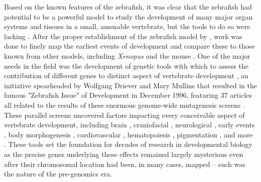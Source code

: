 Based on the known features of the zebrafish, it was clear that the zebrafish had potential to be a powerful model to study the development of many major organ systems and tissues in a small, amenable vertebrate, but the tools to do so were lacking \citep{Bakkers2011}. After the proper establishment of the zebrafish model by \citeauthor{Streisinger1981}, work was done to finely map the earliest events of development and compare these to those known from other models, including \textit{Xenopus} and the mouse \citep{Kimmel1988, Kimmel1989, Kimmel1995}. One of the major needs in the field was the development of genetic tools with which to assess the contribution of different genes to distinct aspect of vertebrate development \citep{Driever1994, Mullins1994}, an initiative spearheaded by Wolfgang Driever and Mary Mullins that resulted in the famous "Zebrafish Issue" of Development in December 1996, featuring 37 articles all related to the results of these enormous genome-wide mutagenesis screens \citep{Mullins2021, NussleinVolhard2012, Haffter1996, Driever1996, Knapik1996}. These parallel screens uncovered factors impacting every conceivable aspect of vertebrate development, including brain \citep{Schier1996, Heisenberg1996, Jiang1996, Brand1996b, Stemple1996, Odenthal1996a}, craniofacial \citep{Whitfield1996, Malicki1996b, Schilling1996, Piotrowski1996, Neuhauss1996}, neurological \citep{Malicki1996a, FurutaniSeiki1996, Abdelilah1996, Baier1996, Karlstrom1996, Trowe1996}, early events \citep{Kane1996a, Kane1996b}, body morphogenesis \citep{Brand1996a, vanEeden1996a, vanEeden1996b, Hammerschmidt1996a, Mullins1996, Hammerschmidt1996b}, cardiovascular \citep{Stainier1996, Chen1996}, hematopoiesis \citep{Weinstein1996, Ransom1996}, pigmentation \citep{Kelsh1996, Odenthal1996b}, and more \citep{Granato1996, Pack1996}. These tools set the foundation for decades of research in developmental biology as the precise genes underlying these effects remained largely mysterious even after their chromosomal location had been, in many cases, mapped -- such was the nature of the pre-genomics era.

